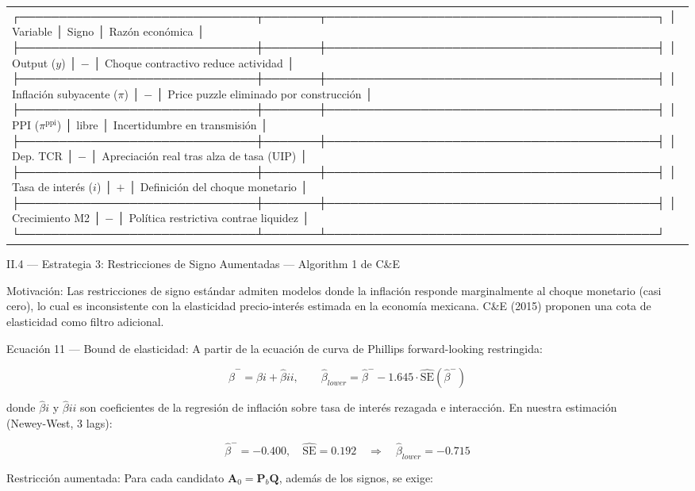 \documentclass[
]{article}
\begin{document}
\begin{longtable}[]{@{}
  >{\raggedright\arraybackslash}p{}@{}}
┌──────────────────────────────┬───────┬──────────────────────────────────────────┐
│ Variable │ Signo │ Razón económica │
├──────────────────────────────┼───────┼──────────────────────────────────────────┤
│ Output (\(y\)) │ \(-\) │ Choque contractivo reduce actividad │
├──────────────────────────────┼───────┼──────────────────────────────────────────┤
│ Inflación subyacente (\(\pi\)) │ \(-\) │ Price puzzle eliminado por
construcción │
├──────────────────────────────┼───────┼──────────────────────────────────────────┤
│ PPI (\(\pi^\text{ppi}\)) │ libre │ Incertidumbre en transmisión │
├──────────────────────────────┼───────┼──────────────────────────────────────────┤
│ Dep. TCR │ \(-\) │ Apreciación real tras alza de tasa (UIP) │
├──────────────────────────────┼───────┼──────────────────────────────────────────┤
│ Tasa de interés (\(i\)) │ \(+\) │ Definición del choque monetario │
├──────────────────────────────┼───────┼──────────────────────────────────────────┤
│ Crecimiento M2 │ \(-\) │ Política restrictiva contrae liquidez │
└──────────────────────────────┴───────┴──────────────────────────────────────────┘ \\
\end{longtable}

II.4 --- Estrategia 3: Restricciones de Signo Aumentadas --- Algorithm 1
de C\&E

Motivación: Las restricciones de signo estándar admiten modelos donde la
inflación responde marginalmente al choque monetario (casi cero), lo
cual es inconsistente con la elasticidad precio-interés estimada en la
economía mexicana. C\&E (2015) proponen una cota de elasticidad como
filtro adicional.

Ecuación 11 --- Bound de elasticidad: A partir de la ecuación de curva
de Phillips forward-looking restringida:

\[\hat{\beta}^- = \hat{\beta}i + \hat{\beta}{ii}, \qquad \hat{\beta}_{lower} = \hat{\beta}^- - 1.645\cdot\widehat{\text{SE}}(\hat{\beta}^-)\]

donde \(\hat{\beta}i\) y \(\hat{\beta}{ii}\) son coeficientes de la
regresión de inflación sobre tasa de interés rezagada e interacción. En
nuestra estimación\\
(Newey-West, 3 lags):

\[\hat{\beta}^- = -0.400, \quad \widehat{\text{SE}} = 0.192 \quad \Rightarrow \quad \hat{\beta}_{lower} = -0.715\]

Restricción aumentada: Para cada candidato
\(\mathbf{A}_0 = \mathbf{P}_b\mathbf{Q}\), además de los signos, se
exige:
\end{document}
